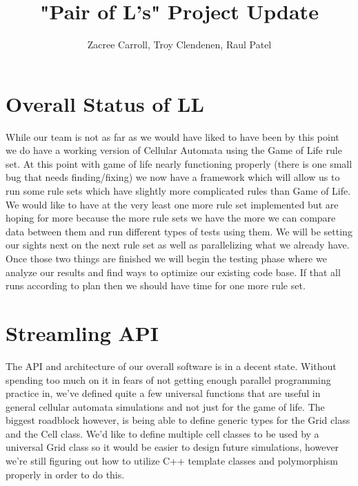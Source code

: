 \documentclass[12pt]{article}
\begin{document}
\title{"Pair of L's" Project Update}
\maketitle
\begin{center}
\author{Zacree Carroll, Troy Clendenen, Raul Patel}
\end{center}

\section{Overall Status of LL}

\par
While our team is not as far as we would have liked to have been by this point we do have a working version of Cellular Automata using the Game of Life rule set. At this point with game of life nearly functioning properly (there is one small bug that needs finding/fixing) we now have a framework which will allow us to run some rule sets which have slightly more complicated rules than Game of Life. We would like to have at the very least one more rule set implemented but are hoping for more because the more rule sets we have the more we can compare data between them and run different types of tests using them. We will be setting our sights next on the next rule set as well as parallelizing what we already have. Once those two things are finished we will begin the testing phase where we analyze our results and find ways to optimize our existing code base. If that all runs according to plan then we should have time for one more rule set. 

\section{Streamling API}

\par
The API and architecture of our overall software is in a decent state. Without spending too much on it in fears of not getting enough parallel programming practice in, we've defined quite a few universal functions that are useful in general cellular automata simulations and not just for the game of life. The biggest roadblock however, is being able to define generic types for the Grid class and the Cell class. We'd like to define multiple cell classes to be used by a universal Grid class so it would be easier to design future simulations, however we're still figuring out how to utilize C++ template classes and polymorphism properly in order to do this. 
\end{document}
